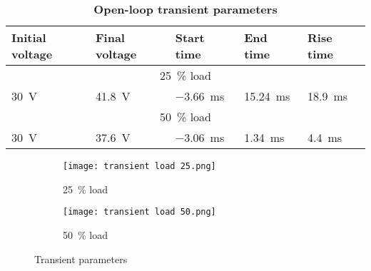 \begin{table}[H]
    \centering
    \caption{\textbf{Open-loop transient parameters}}
    \begin{tabularx}{\columnwidth}{|X|X|X|X|X|}
        \hline
        Initial voltage & Final voltage     & Start time       & End time         & Rise time       \\
        \hline
        \multicolumn{5}{|c|}{\qty{25}{\percent} load}                                               \\
        \hline
        \qty{30}{\volt} & \qty{41.8}{\volt} & \qty{-3.66}{\ms} & \qty{15.24}{\ms} & \qty{18.9}{\ms} \\
        \hline
        \multicolumn{5}{|c|}{\qty{50}{\percent} load}                                               \\
        \hline
        \qty{30}{\volt} & \qty{37.6}{\volt} & \qty{-3.06}{\ms} & \qty{1.34}{\ms}  & \qty{4.4}{\ms}  \\
        \hline
    \end{tabularx}
    \label{table:oltrans}
\end{table}
\begin{figure}[H]
    \begin{subfigure}{0.5\textwidth}
        \texttt{[image: transient load 25.png]}
        \caption{\qty{25}{\percent} load}
    \end{subfigure}
    \hfill
    \begin{subfigure}{0.5\textwidth}
        \texttt{[image: transient load 50.png]}
        \caption{\qty{50}{\percent} load}
    \end{subfigure}
    \caption{Transient parameters}
\end{figure}



